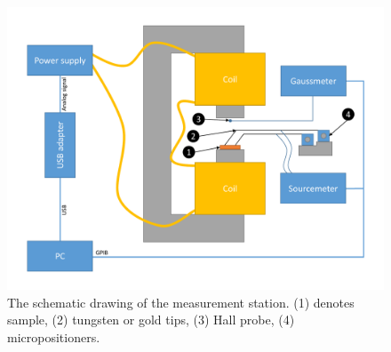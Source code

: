     \begin{figure}[H]
        \centering
        \includegraphics[width=0.65\paperwidth, page=1]{img/05/MeasurementSetup.pdf}
        \caption{The schematic drawing of the measurement station. (1) denotes sample, (2) tungsten or gold tips, (3) Hall probe, (4) micropositioners.}
        \label{ExperimentMeasurementSetup}
    \end{figure}
    
